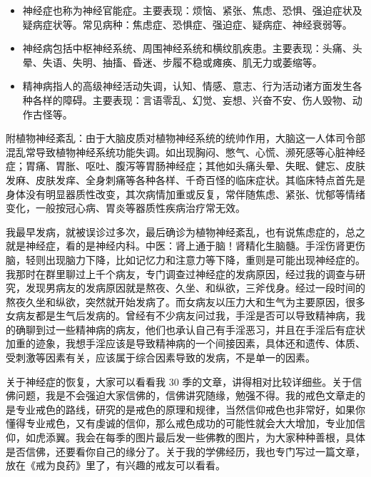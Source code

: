 \begin{case}
\begin{itemize}
    \item 神经症也称为神经官能症。主要表现：烦恼、紧张、焦虑、恐惧、强迫症状及疑病症状等。常见病种：焦虑症、恐惧症、强迫症、疑病症、神经衰弱等。
    \item 神经病包括中枢神经系统、周围神经系统和横纹肌疾患。主要表现：头痛、头晕、失语、失明、抽搐、昏迷、步履不稳或瘫痪、肌无力或萎缩等。
    \item 精神病指人的高级神经活动失调，认知、情感、意志、行为活动诸方面发生各种各样的障碍。主要表现：言语零乱、幻觉、妄想、兴奋不安、伤人毁物、动作古怪等。
\end{itemize}

    附植物神经紊乱：由于大脑皮质对植物神经系统的统帅作用，大脑这一人体司令部混乱常导致植物神经系统功能失调。如出现胸闷、憋气、心慌、濒死感等心脏神经症；胃痛、胃胀、呕吐、腹泻等胃肠神经症；其他如头痛头晕、失眠、健忘、皮肤发麻、皮肤发痒、全身刺痛等各种各样、千奇百怪的临床症状。其临床特点首先是身体没有明显器质性改变，其次病情加重或反复，常伴随焦虑、紧张、忧郁等情绪变化，一般按冠心病、胃炎等器质性疾病治疗常无效。

    我最早发病，就被误诊过多次，最后确诊为植物神经紊乱，也有说焦虑症的，总之就是神经症，看的是神经内科。中医：肾上通于脑！肾精化生脑髓。手淫伤肾更伤脑，轻则出现脑力下降，比如记忆力和注意力等下降，重则是可能出现神经症的。我那时在群里聊过上千个病友，专门调查过神经症的发病原因，经过我的调查与研究，发现男病友的发病原因就是熬夜、久坐、和纵欲，三斧伐身。经过一段时间的熬夜久坐和纵欲，突然就开始发病了。而女病友以压力大和生气为主要原因，很多女病友都是生气后发病的。曾经有不少病友问过我，手淫是否可以导致精神病，我的确聊到过一些精神病的病友，他们也承认自己有手淫恶习，并且在手淫后有症状加重的迹象，我想手淫应该是导致精神病的一个间接因素，具体还和遗传、体质、受刺激等因素有关，应该属于综合因素导致的发病，不是单一的因素。

    关于神经症的恢复，大家可以看看我 30 季的文章，讲得相对比较详细些。关于信佛问题，我是不会强迫大家信佛的，信佛讲究随缘，勉强不得。我的戒色文章走的是专业戒色的路线，研究的是戒色的原理和规律，当然信仰戒色也非常好，如果你懂得专业戒色，又有虔诚的信仰，那么戒色成功的可能性就会大大增加，专业加信仰，如虎添翼。我会在每季的图片最后发一些佛教的图片，为大家种种善根，具体是否信佛，还要看你自己的缘分了。关于我的学佛经历，我也专门写过一篇文章，放在《戒为良药》里了，有兴趣的戒友可以看看。
\end{case}

